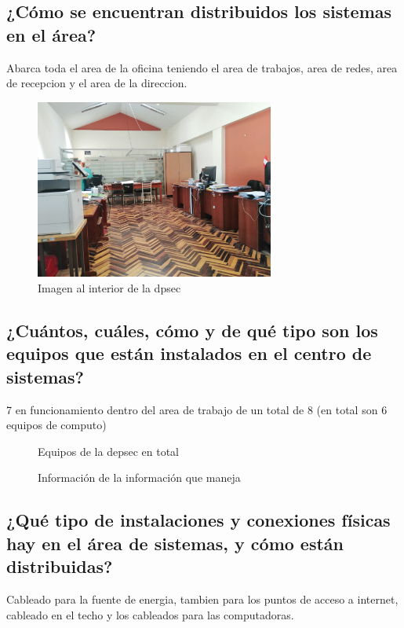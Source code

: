 \documentclass[12pt,a4paper]{article}
\begin{document}
\subsection{¿Cómo se encuentran distribuidos los sistemas en el área?}
Abarca toda el area de la oficina teniendo el area de trabajos, area de redes, area de recepcion y el area de la direccion.
\begin{figure}[!htb]
    \centering
    \includegraphics[width=0.7\textwidth]{images/AreaTrabajo.jpeg}
    \caption{Imagen al interior de la dpsec}

\end{figure}
\subsection*{¿Cuántos, cuáles, cómo y de qué tipo son los equipos que están instalados
en el centro de sistemas?}
7 en funcionamiento dentro del area de trabajo de un total de 8 (en total son 6 equipos de computo)
\begin{figure}[!htb]
    \centering
    \caption{Equipos de la depsec en total}
\end{figure}

\begin{figure}[!htb]
    \centering
    \caption{Información de la información que maneja}
\end{figure}

\subsection*{¿Qué tipo de instalaciones y conexiones físicas hay en el área de sistemas, y
cómo están distribuidas?}
Cableado  para la fuente de energia, tambien para los puntos de acceso a internet, cableado en el techo y los cableados para las computadoras.
\end{document}
